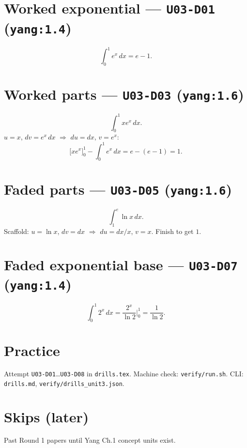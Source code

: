 \section{Worked exponential --- \texttt{U03-D01} (\texttt{yang:1.4})}
\[
\int_0^1 e^x\,dx = e-1.
\]

\section{Worked parts --- \texttt{U03-D03} (\texttt{yang:1.6})}
\[
\int_0^1 x e^x\,dx.
\]
$u=x$, $dv=e^x\,dx$ $\Rightarrow$ $du=dx$, $v=e^x$:
\[
\big[x e^x\big]_0^1 - \int_0^1 e^x\,dx = e - (e-1) = 1.
\]

\section{Faded parts --- \texttt{U03-D05} (\texttt{yang:1.6})}
\[
\int_1^{e}\ln x\,dx.
\]
Scaffold: $u=\ln x$, $dv=dx$ $\Rightarrow$ $du=dx/x$, $v=x$. Finish to get $1$.

\section{Faded exponential base --- \texttt{U03-D07} (\texttt{yang:1.4})}
\[
\int_0^1 2^x\,dx = \frac{2^x}{\ln 2}\Big|_0^1 = \frac{1}{\ln 2}.
\]


\section{Practice}
Attempt \texttt{U03-D01}\ldots\texttt{U03-D08} in \texttt{drills.tex}.
Machine check: \texttt{verify/run.sh}. CLI: \texttt{drills.md}, \texttt{verify/drills\_unit3.json}.

\section{Skips (later)}
Past Round 1 papers until Yang Ch.1 concept units exist.

